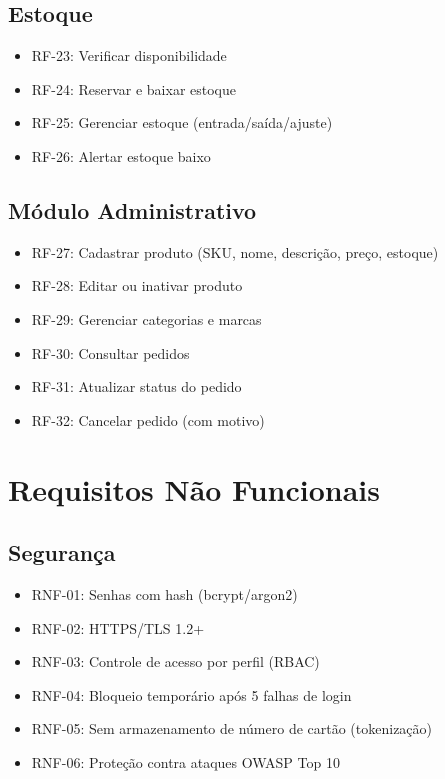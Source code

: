 \documentclass[12pt,a4paper]{article}
\providecommand{\tightlist}{%
  \setlength{\itemsep}{0pt}\setlength{\parskip}{0pt}}
\begin{document}
\subsection{Estoque}

\begin{itemize}
\tightlist
\item RF-23: Verificar disponibilidade
\item RF-24: Reservar e baixar estoque
\item RF-25: Gerenciar estoque (entrada/saída/ajuste)
\item RF-26: Alertar estoque baixo
\end{itemize}

\subsection{Módulo Administrativo}

\begin{itemize}
\tightlist
\item RF-27: Cadastrar produto (SKU, nome, descrição, preço, estoque)
\item RF-28: Editar ou inativar produto
\item RF-29: Gerenciar categorias e marcas
\item RF-30: Consultar pedidos
\item RF-31: Atualizar status do pedido
\item RF-32: Cancelar pedido (com motivo)
\end{itemize}

\section{Requisitos Não Funcionais}\label{sec:rnf}

\subsection{Segurança}

\begin{itemize}
\tightlist
\item RNF-01: Senhas com hash (bcrypt/argon2)
\item RNF-02: HTTPS/TLS 1.2+
\item RNF-03: Controle de acesso por perfil (RBAC)
\item RNF-04: Bloqueio temporário após 5 falhas de login
\item RNF-05: Sem armazenamento de número de cartão (tokenização)
\item RNF-06: Proteção contra ataques OWASP Top 10
\end{itemize}
\end{document}
